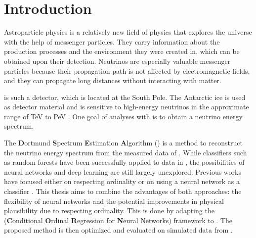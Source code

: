 \chapter{Introduction}
Astroparticle physics is a relatively new field of physics
  that explores the universe
    with the help of messenger particles.
They carry information about
    the production processes
    and the environment they were created in,
  which can be obtained upon their detection.
Neutrinos are especially valuable messenger particles
  because their propagation path is not affected by electromagnetic fields,
  and they can propagate long distances without interacting with matter.


\icecube{} is such a detector,
  which is located at the South Pole.
The Antarctic ice is used as detector material
  and is sensitive to high-energy neutrinos
    in the approximate range of \si{\tera\electronvolt} to \si{\peta\electronvolt} \cite{icecube_aartsen}.
%
One goal of analyses with \icecube{} is
  to obtain a neutrino energy spectrum.

The \textbf{D}ortmund \textbf{S}pectrum \textbf{E}stimation \textbf{A}lgorithm (\dsea{}) \cite{dsea_unification}
is a method to reconstruct the neutrino energy spectrum
  from the measured data of \icecube{}.
While classifiers such as random forests
have been successfully applied to \icecube{} data in \dsea{} \cite{hymon2021seasonal},
the possibilities of neural networks and deep learning are still largely unexplored. %
%
Previous works
have focused either
  on respecting ordinality \cite{dsea_jan} %
  or on using a neural network as a classifier \cite{dsea_samuel}.
This thesis aims to combine the advantages of both approaches:
  the flexibility of neural networks
  and the potential improvements in physical plausibility
    due to respecting ordinality.
This is done by adapting the
\corn{} (\textbf{C}onditional \textbf{O}rdinal \textbf{R}egression for \textbf{N}eural Networks) framework \cite{corn}
to \dsea{}.
The proposed method is then optimized and evaluated
  on simulated data from \icecube{}.

